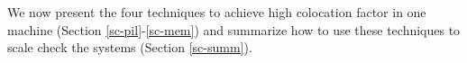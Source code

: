 \section{\sck}

We now present the four \sck techniques to achieve high colocation factor in
one machine (Section \ref{sc-pil}-\ref{sc-mem}) and summarize how to use these
techniques to scale check the systems (Section \ref{sc-summ}).




